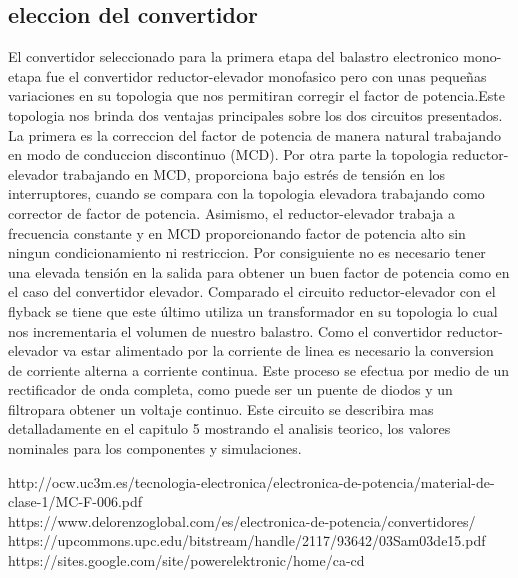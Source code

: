 \documentclass[11pt]{article}
\begin{document}
\subsection{eleccion del convertidor}
El  convertidor  seleccionado  para  la  primera  etapa  del  balastro  electronico  mono-etapa fue el convertidor reductor-elevador monofasico pero con unas pequeñas variaciones en su topologia que nos permitiran corregir el factor de potencia.Este  topologia  nos  brinda  dos  ventajas  principales  sobre  los  dos  circuitos  presentados.  La  primera  es  la  correccion  del  factor  de  potencia  de  manera  natural  trabajando  en  modo  de  conduccion  discontinuo  (MCD).  Por  otra  parte  la  topologia  reductor-elevador  trabajando  en  MCD,  proporciona  bajo  estrés  de  tensión  en  los  interruptores,  cuando  se  compara  con  la  topologia elevadora trabajando como corrector de factor de potencia. Asimismo, el reductor-elevador trabaja a frecuencia constante y en MCD proporcionando factor de potencia alto sin ningun  condicionamiento  ni  restriccion.  Por  consiguiente  no  es  necesario  tener  una  elevada  tensión en la salida para obtener un buen factor de potencia como en el caso del convertidor elevador.  Comparado  el  circuito  reductor-elevador  con  el  flyback  se  tiene  que  este  último  utiliza  un  transformador  en  su  topologia  lo  cual  nos  incrementaria  el  volumen  de  nuestro  balastro. Como  el  convertidor  reductor-elevador  va  estar  alimentado  por  la  corriente  de  linea  es  necesario la conversion de corriente alterna a corriente continua. Este proceso se efectua por medio  de  un  rectificador  de  onda  completa,  como  puede  ser  un  puente  de  diodos  y  un  filtropara obtener un voltaje continuo. Este circuito se describira mas detalladamente en el capitulo 5 mostrando el analisis teorico, los valores nominales para los componentes  y simulaciones.


{http://ocw.uc3m.es/tecnologia-electronica/electronica-de-potencia/material-de-clase-1/MC-F-006.pdf}\\{https://www.delorenzoglobal.com/es/electronica-de-potencia/convertidores/}\\
{https://upcommons.upc.edu/bitstream/handle/2117/93642/03Sam03de15.pdf}\\
{https://sites.google.com/site/powerelektronic/home/ca-cd}

\end{document}
